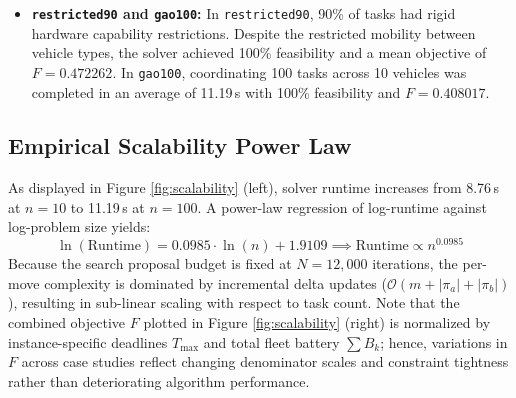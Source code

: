 \begin{itemize}
    To determine whether this infeasibility was structural or computational, a \textit{high-budget diagnostic experiment} was conducted using 60,000 iterations and 100 construction restarts (fixed seed 0). Under this setting, the solver successfully discovered a strictly feasible solution with:
    \begin{equation}
        F = 0.604944, \quad \text{Violation} = 0.000000, \quad \text{Wall Time} = 54.80\,\text{s}
    \end{equation}
    The detailed diagnostic constraint logs confirmed:
    \begin{equation}
        g_{\text{capability}} = 0.0, \quad g_{\text{payload}} = 0.0, \quad g_{\text{energy}} = 0.0, \quad g_{\text{deadline}} = 0.0
    \end{equation}
    The optimized routes allocated 13, 10, 17, and 16 tasks to the 4 UGVs (handling 56 of the 75 tasks), while restricting the 4 battery-depleted UAVs to short, high-priority sorties of 4, 5, 5, and 5 tasks. This confirms that the problem instance is fully feasible, but requires deeper search effort when battery margins are razor-thin.
    \item \textbf{\texttt{restricted90} and \texttt{gao100}:} In \texttt{restricted90}, 90\% of tasks had rigid hardware capability restrictions. Despite the restricted mobility between vehicle types, the solver achieved 100\% feasibility and a mean objective of $F = 0.472262$. In \texttt{gao100}, coordinating 100 tasks across 10 vehicles was completed in an average of 11.19\,s with 100\% feasibility and $F = 0.408017$.
\end{itemize}

\subsection{Empirical Scalability Power Law}
As displayed in Figure \ref{fig:scalability} (left), solver runtime increases from 8.76\,s at $n=10$ to 11.19\,s at $n=100$. A power-law regression of log-runtime against log-problem size yields:
\begin{equation}
    \ln(\text{Runtime}) = 0.0985 \cdot \ln(n) + 1.9109 \implies \text{Runtime} \propto n^{0.0985}
\end{equation}
Because the search proposal budget is fixed at $N = 12,000$ iterations, the per-move complexity is dominated by incremental delta updates ($\mathcal{O}(m + |\pi_a| + |\pi_b|)$), resulting in sub-linear scaling with respect to task count. Note that the combined objective $F$ plotted in Figure \ref{fig:scalability} (right) is normalized by instance-specific deadlines $T_{\max}$ and total fleet battery $\sum B_k$; hence, variations in $F$ across case studies reflect changing denominator scales and constraint tightness rather than deteriorating algorithm performance.

